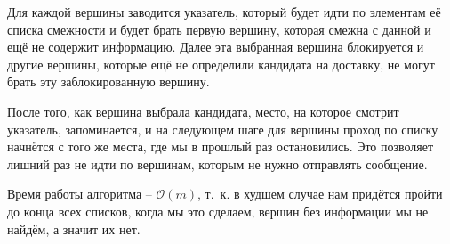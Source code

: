 Для каждой вершины заводится указатель, который будет идти по элементам её списка смежности и будет брать первую вершину, которая смежна с данной и ещё не содержит информацию. Далее эта выбранная вершина блокируется и другие вершины, которые ещё не определили кандидата на доставку, не могут брать эту заблокированную вершину.

После того, как вершина выбрала кандидата, место, на которое смотрит указатель, запоминается, и на следующем шаге для вершины проход по списку начнётся с того же места, где мы в прошлый раз остановились. Это позволяет лишний раз не идти по вершинам, которым не нужно отправлять сообщение. 

Время работы алгоритма -- $\mathcal{O}(m)$, т. к. в худшем случае нам придётся пройти до конца всех списков, когда мы это сделаем, вершин без информации мы не найдём, а значит их нет. 
